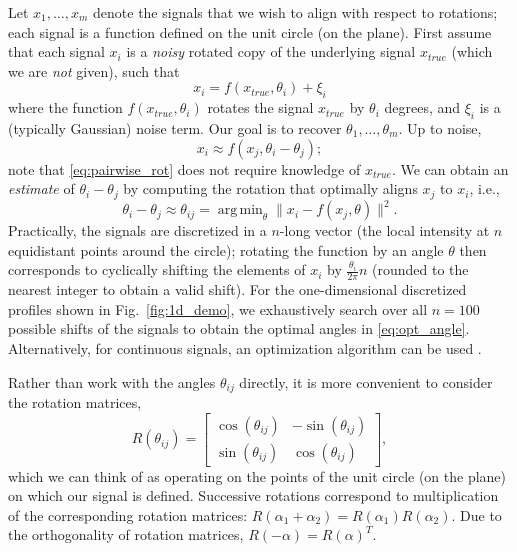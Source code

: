 \documentclass{pnastwo}
\DeclareMathOperator*{\argmin}{arg\,min}
\newcommand{\fig}[0]{Fig.}
\begin{document}
\begin{article}
Let $ x_1, \dots, x_m$ denote the signals that we wish to align with respect to rotations;
each signal is a function defined on the unit circle (on the plane).
%
%
First assume that each signal $x_i$ is a {\it noisy} rotated copy of the underlying signal $x_{true}$
(which we are {\it not} given), such that
\begin{equation}
x_i = f(x_{true}, \theta_i) + \xi_i
\end{equation}
where the function $f(x_{true}, \theta_i)$ rotates the signal $x_{true}$ by $\theta_i$ degrees, and $\xi_i$ is a (typically Gaussian) noise term.
%
Our goal is to recover $\theta_1, \dots, \theta_m$.
%
Up to noise,
\begin{equation} \label{eq:pairwise_rot}
x_i \approx f(x_j, \theta_i - \theta_j) ;
\end{equation}
note that \eqref{eq:pairwise_rot} does not require knowledge of $x_{true}$.
%
We can obtain an {\it estimate} of $\theta_i - \theta_j$ by computing the rotation that optimally aligns $x_j$ to $x_i$,
i.e., %
%
\begin{equation} \label{eq:opt_angle}
\theta_i - \theta_j \approx \theta_{ij} = \argmin_{\theta} \|x_i - f(x_j, \theta)\|^2.
\end{equation}
%
Practically, the signals are discretized in a $n$-long vector (the local intensity at $n$ equidistant points around the circle);
rotating the function by an angle $\theta$ then corresponds to cyclically shifting the elements of $x_i$
by $\frac{\theta_i}{2 \pi} n$ (rounded to the nearest integer to obtain a valid shift).
%
For the one-dimensional discretized profiles shown in \fig~\ref{fig:1d_demo}, we exhaustively search over all $n=100$ possible shifts of the signals to obtain the optimal angles in \eqref{eq:opt_angle}.
%
Alternatively, for continuous signals, an optimization algorithm
can be used \cite{ahuja2007template}.

Rather than work with the angles $\theta_{ij}$ directly, it is more convenient to consider the rotation matrices,
\begin{equation} \label{eq:R_theta}
R(\theta_{ij}) = \begin{bmatrix}
\cos(\theta_{ij}) & -\sin(\theta_{ij}) \\
\sin(\theta_{ij}) & \cos(\theta_{ij})
\end{bmatrix},
\end{equation}
which we can think of as operating on the points of the unit circle (on the plane) on which our signal is defined.
%
Successive rotations correspond to multiplication of the corresponding rotation matrices: $R(\alpha_1 + \alpha_2) = R(\alpha_1) R(\alpha_2)$.
%
Due to the orthogonality of rotation matrices, $R(-\alpha) = R(\alpha)^T$.


\end{article}
\end{document}
